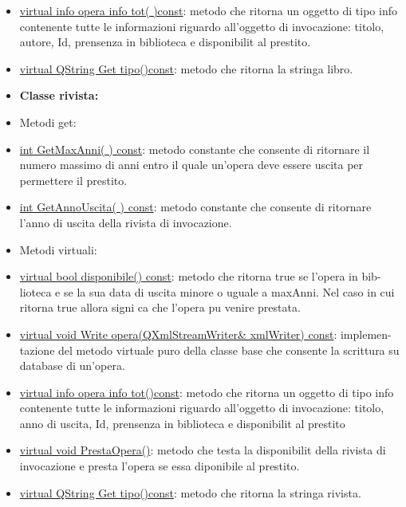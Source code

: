 \documentclass[10pt]{article}
\begin{document}
\begin{itemize}
		\item \underline{virtual info opera info tot( )const}: metodo che ritorna un oggetto di tipo info contenente tutte le informazioni riguardo all'oggetto di invocazione: titolo, autore, Id, prensenza in biblioteca e disponibilit al prestito.

		\item \underline{virtual QString Get tipo()const}: metodo che ritorna la stringa libro.

\item \textbf{Classe rivista:}

\item Metodi get:

		\item \underline{int GetMaxAnni( ) const}: metodo constante che consente di ritornare il numero massimo di anni entro il quale un'opera deve essere uscita per permettere il prestito.

		\item \underline{int GetAnnoUscita( ) const}: metodo constante che consente di ritornare l'anno di uscita della rivista di invocazione.

\item Metodi virtuali:

		\item \underline{virtual bool disponibile() const}: metodo che ritorna true se l'opera in bib-lioteca e se la sua data di uscita minore o uguale a maxAnni. Nel caso in cui ritorna true allora signi ca che l'opera pu venire prestata.

		\item \underline{virtual void Write opera(QXmlStreamWriter\& xmlWriter) const}: implemen-tazione del metodo virtuale puro della classe base che consente la scrittura su database di un'opera.

		\item \underline{virtual info opera info tot()const}: metodo che ritorna un oggetto di tipo info contenente tutte le informazioni riguardo all'oggetto di invocazione: titolo, anno di uscita, Id, prensenza in biblioteca e disponibilit al prestito

		\item \underline{virtual void PrestaOpera()}: metodo che testa la disponibilit della rivista di invocazione e presta l'opera se essa diponibile al prestito.

		\item \underline{virtual QString Get tipo()const}: metodo che ritorna la stringa rivista.
\end{itemize}
\end{document}
